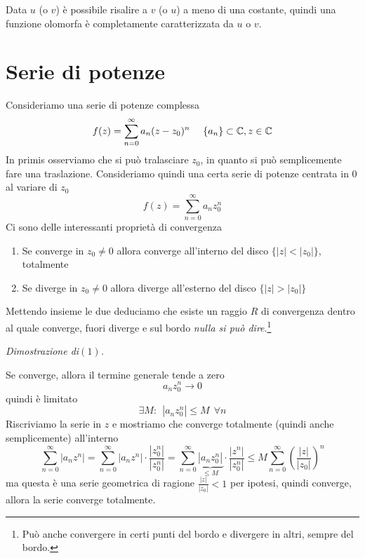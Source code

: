 Data $u$ (o $v$) è possibile risalire a $v$ (o $u$) a meno di una costante, quindi una funzione olomorfa è completamente caratterizzata da $u$ o $v$.

\section{Serie di potenze}

Consideriamo una serie di potenze complessa
\begin{equation*}
f(z) = \sum\limits^{\infty}_{n = 0} a_{n}(z - z_{0})^{n} \ \ \ \ \{a_{n}\} \subset \mathbb{C}, z\in \mathbb{C}
\end{equation*}
In primis osserviamo che si può tralasciare $z_{0}$, in quanto si può semplicemente fare una traslazione. Consideriamo quindi una certa serie di potenze centrata in $0$ al variare di $z_{0}$
\begin{equation*}
f(z) = \sum\limits^{\infty}_{n = 0} a_{n} z^{n}_{0}
\end{equation*}
Ci sono delle interessanti proprietà di convergenza
\begin{enumerate}
\item Se converge in $z_{0} \neq 0$ allora converge all'interno del disco $\{| z| < | z_{0}| \}$, totalmente
\item Se diverge in $z_{0} \neq 0$ allora diverge all'esterno del disco $\{| z| > | z_{0}| \}$
\end{enumerate}

Mettendo insieme le due deduciamo che esiste un raggio $R$ di convergenza dentro al quale converge, fuori diverge e sul bordo \textit{nulla si può dire}.\footnote{Può anche convergere in certi punti del bordo e divergere in altri, sempre del bordo.}

\textit{Dimostrazione di}$(1)$\textit{.}

Se converge, allora il termine generale tende a zero
\begin{equation*}
a_{n} z^{n}_{0}\rightarrow 0
\end{equation*}
quindi è limitato
\begin{equation*}
\exists M : \ \ \left| a_{n} z^{n}_{0}\right| \leq M\ \ \forall n
\end{equation*}
Riscriviamo la serie in $z$ e mostriamo che converge totalmente (quindi anche semplicemente) all'interno
\begin{equation*}
\sum\limits^{\infty}_{n = 0}\left| a_{n} z^{n}\right| = \sum\limits^{\infty}_{n = 0}\left| a_{n} z^{n}\right| \cdot \frac{\left| z^{n}_{0}\right|}{\left| z^{n}_{0}\right|} = \sum\limits^{\infty}_{n = 0}\underbrace{\left| a_{n} z^{n}_{0}\right|}_{ \leq M} \cdot \frac{\left| z^{n}\right|}{\left| z^{n}_{0}\right|} \leq M\sum\limits^{\infty}_{n = 0}\left(\frac{| z|}{| z_{0}|}\right)^{n}
\end{equation*}
ma questa è una serie geometrica di ragione $\frac{| z|}{| z_{0}|} < 1$ per ipotesi, quindi converge, allora la serie converge totalmente.

